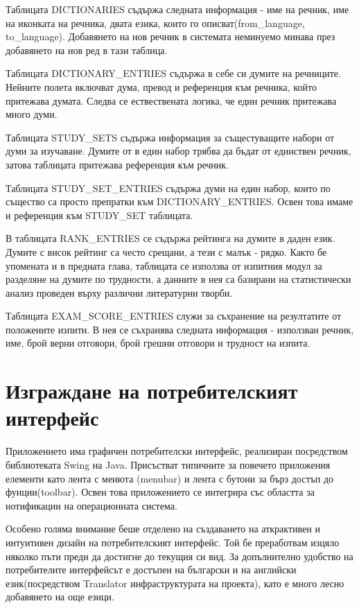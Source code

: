Таблицата DICTIONARIES съдържа следната информация - име на речник,
име на иконката на речника, двата езика, които го
описват(from\_language, to\_language). Добавянето на нов речник в
системата неминуемо минава през добавянето на нов ред в тази таблица. 

Таблицата DICTIONARY\_ENTRIES съдържа в себе си думите на
речниците. Нейните полета включват дума, превод и референция към
речника, който притежава думата. Следва се ествествената логика, че
един речник притежава много думи.

Таблицата STUDY\_SETS съдържа информация за същестуващите набори от
думи за изучаване. Думите от в един набор трябва да бъдат от
единствен речник, затова таблицата притежава референция към речник.

Таблицата STUDY\_SET\_ENTRIES съдържа думи на един набор, които по
същество са просто препратки към DICTIONARY\_ENTRIES. Освен това имаме
и референция към STUDY\_SET таблицата.

В таблицата RANK\_ENTRIES се съдържа рейтинга на думите в даден
език. Думите с висок рейтинг са често срещани, а тези с малък -
рядко. Както бе упомената и в предната глава, таблицата се използва от
изпитния модул за разделяне на думите по трудности, а данните в нея са
базирани на статистически анализ проведен върху различни литературни
творби.

Таблицата EXAM\_SCORE\_ENTRIES служи за съхранение на резултатите от
положените изпити. В нея се съхранява следната информация - използван
речник, име, брой верни отговори, брой грешни отговори и трудност на
изпита. 
\section{Изграждане на потребителският интерфейс}

Приложението има графичен потребителски интерфейс, реализиран
посредством библиотеката Swing на Java. Присъстват типичните за
повечето приложения елементи като лента с менюта (menubar) и лента с
бутони за бърз достъп до фунции(toolbar). Освен това приложението се
интегрира със областта за нотификации на операционната система.

Особено голяма внимание беше отделено на създаването на аткрактивен и
интуитивен дизайн на потребителският интерфейс. Той бе преработвам
изцяло няколко пъти преди да достигне до текущия си вид. За
допълнително удобство на потребителите интерфейсът е достъпен на
български и на английски език(посредством Translator инфраструктурата
на проекта), като е много лесно добавянето на още езици. 

